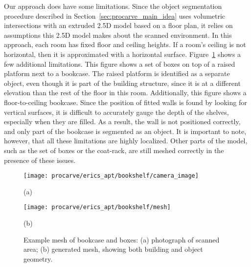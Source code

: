 \documentclass[12pt,onecolumn,oneside]{book}
\begin{document}
Our approach does have some limitations.  Since the object segmentation procedure described in Section~\ref{sec:procarve_main_idea} uses volumetric intersections with an extruded 2.5D model based on a floor plan, it relies on assumptions this 2.5D model makes about the scanned environment.  In this approach, each room has fixed floor and ceiling heights.  If a room's ceiling is not horizontal, then it is approximated with a horizontal surface.  Figure~\ref{fig:procarve_bookcase} shows a few additional limitations.  This figure shows a set of boxes on top of a raised platform next to a bookcase.  The raised platform is identified as a separate object, even though it is part of the building structure, since it is at a different elevation than the rest of the floor in this room.  Additionally, this figure shows a floor-to-ceiling bookcase.  Since the position of fitted walls is found by looking for vertical surfaces, it is difficult to accurately gauge the depth of the shelves, especially when they are filled.  As a result, the wall is not positioned correctly, and only part of the bookcase is segmented as an object.  It is important to note, however, that all these limitations are highly localized.  Other parts of the model, such as the set of boxes or the coat-rack, are still meshed correctly in the presence of these issues.

\begin{figure}[t]

	\begin{minipage}[t]{0.45\linewidth} %
		\centerline{\texttt{[image: procarve/erics\_apt/bookshelf/camera\_image]}}
		\centerline{(a)}
	\end{minipage}
	\hfill
	\begin{minipage}[t]{0.45\linewidth} %
		\centerline{\texttt{[image: procarve/erics\_apt/bookshelf/mesh]}}
		\centerline{(b)}
	\end{minipage}
	
	\caption[Example mesh of bookcase and boxes.]{Example mesh of bookcase and boxes: (a) photograph of scanned area; (b) generated mesh, showing both building and object geometry.}
	\label{fig:procarve_bookcase}
\end{figure}


\end{document}
